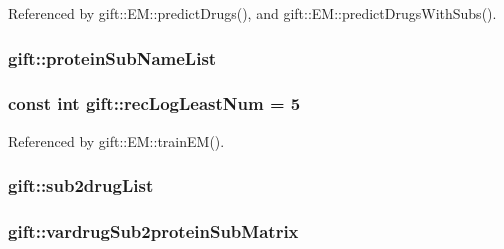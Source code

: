 Referenced by gift\+::\+E\+M\+::predict\+Drugs(), and gift\+::\+E\+M\+::predict\+Drugs\+With\+Subs().

\subsubsection[{\texorpdfstring{protein\+Sub\+Name\+List}{proteinSubNameList}}]{ gift\+::protein\+Sub\+Name\+List}\hypertarget{namespacegift_a55fa4ad0822bcbe5ca42f2962e111ef1}{}\label{namespacegift_a55fa4ad0822bcbe5ca42f2962e111ef1}
\subsubsection[{\texorpdfstring{rec\+Log\+Least\+Num}{recLogLeastNum}}]{\setlength{\rightskip}{0pt plus 5cm}const int gift\+::rec\+Log\+Least\+Num = 5}\hypertarget{namespacegift_ab632fcb7ab144fdde38c5a4154e2b5b7}{}\label{namespacegift_ab632fcb7ab144fdde38c5a4154e2b5b7}


Referenced by gift\+::\+E\+M\+::train\+E\+M().

\subsubsection[{\texorpdfstring{sub2drug\+List}{sub2drugList}}]{ gift\+::sub2drug\+List}\hypertarget{namespacegift_afcc3e6429fa4fef47fb34e30d2f0c6c4}{}\label{namespacegift_afcc3e6429fa4fef47fb34e30d2f0c6c4}
\subsubsection[{\texorpdfstring{vardrug\+Sub2protein\+Sub\+Matrix}{vardrugSub2proteinSubMatrix}}]{ gift\+::vardrug\+Sub2protein\+Sub\+Matrix}\hypertarget{namespacegift_a7191203810c7c52faceb69ac903e7899}{}\label{namespacegift_a7191203810c7c52faceb69ac903e7899}
